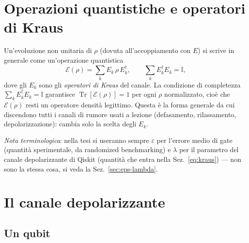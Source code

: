\documentclass[11pt,a4paper]{article}
\newcommand{\Tr}{\operatorname{Tr}}
\begin{document}
\section{Operazioni quantistiche e operatori di Kraus}
\label{sec:kraus}

Un'evoluzione non unitaria di $\rho$ (dovuta all'accoppiamento con $E$) si scrive in
generale come un'operazione quantistica
\begin{equation}
\mathcal E(\rho) = \sum_k E_k\,\rho\,E_k^\dagger, \qquad
\sum_k E_k^\dagger E_k = \mathbb{I},
\label{eq:kraus}
\end{equation}
dove gli $E_k$ sono gli \emph{operatori di Kraus} del canale. La condizione di
completezza $\sum_k E_k^\dagger E_k=\mathbb{I}$ garantisce $\Tr[\mathcal E(\rho)]=1$
per ogni $\rho$ normalizzato, cioè che $\mathcal E(\rho)$ resti un operatore densità
legittimo. Questa è la forma generale da cui discendono tutti i canali di rumore usati
a lezione (defasamento, rilassamento, depolarizzazione): cambia solo la scelta degli
$E_k$.

\emph{Nota terminologica}: nella tesi si useranno sempre $\varepsilon$ per l'errore
medio di gate (quantità sperimentale, da randomized benchmarking) e $\lambda$ per il
parametro del canale depolarizzante di Qiskit (quantità che entra nella
Sez.~\eqref{eq:kraus}) --- non sono la stessa cosa, si veda la Sez.~\ref{sec:eps-lambda}.

\section{Il canale depolarizzante}
\label{sec:depol}

\subsection{Un qubit}
\end{document}
